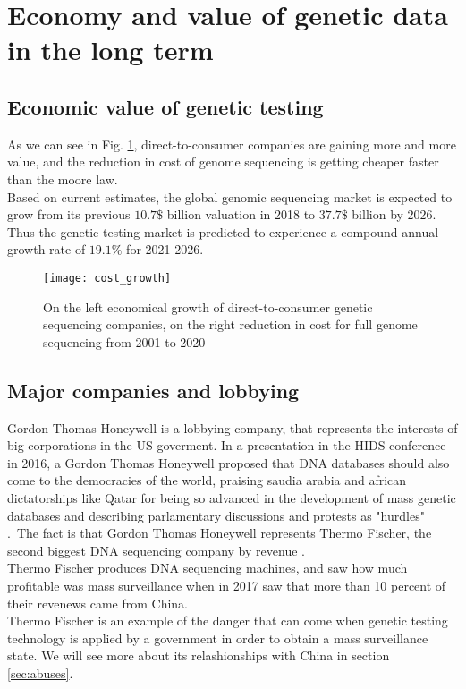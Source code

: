 \documentclass[12pt]{article}
\begin{document}
\newpage
\section{Economy and value of genetic data in the long term}
\label{sec:economy}
\subsection{Economic value of genetic testing}
As we can see in Fig. \ref{img:cost_growth}, direct-to-consumer companies are gaining more and more value, and the reduction in cost of genome sequencing is getting cheaper faster than 
the moore law.\\
Based on current estimates, the global genomic sequencing market is expected to grow from its previous $10.7\$$ billion valuation in 2018 to $37.7\$$ billion by 2026. 
Thus the genetic testing market is predicted to experience a compound annual growth rate of $19.1\%$ for 2021-2026. \cite{economy_genome}

\begin{figure}[H]
    \centering
    \texttt{[image: cost\_growth]}
    \caption{On the left economical growth of direct-to-consumer genetic sequencing companies, on the right reduction in cost for full genome sequencing from 2001 to 2020}
    \label{img:cost_growth}
\end{figure}

\subsection{Major companies and lobbying}
Gordon Thomas Honeywell is a lobbying company, that represents the interests of big corporations in the US goverment. In a presentation in the HIDS conference in 2016, a Gordon Thomas Honeywell
 proposed that DNA databases should also come to the democracies of the world, praising saudia arabia and african dictatorships like Qatar for being so advanced in the development of mass genetic databases and describing parlamentary discussions and protests as "hurdles" \cite{fischer_honeywell}.\
The fact is that Gordon Thomas Honeywell represents Thermo Fischer, the second biggest DNA sequencing company by revenue \cite{big_companies}.\\
Thermo Fischer produces DNA sequencing machines, 
and saw how much profitable was mass surveillance when in 2017 saw that more than 10 percent of their revenews came from China. \cite{china_fischer}\\
Thermo Fischer is an example of the danger that can come when genetic testing technology is applied by a government in order to obtain a mass surveillance state. We will see more about its relashionships with China in section \ref{sec:abuses}.
\newpage
\end{document}

